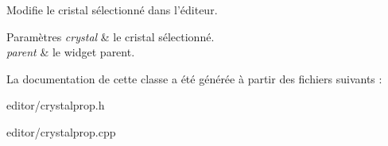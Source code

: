 Modifie le cristal sélectionné dans l’éditeur. 


\begin{DoxyParams}{Paramètres}
{\em crystal} & le cristal sélectionné. \\
\hline
{\em parent} & le widget parent. \\
\hline
\end{DoxyParams}


La documentation de cette classe a été générée à partir des fichiers suivants \+:\begin{DoxyCompactItemize}
\item 
editor/crystalprop.\+h\item 
editor/crystalprop.\+cpp\end{DoxyCompactItemize}
